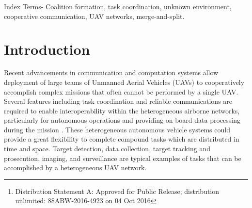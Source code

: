 \documentclass[conference]{IEEEtran}
\theoremstyle{remark}
\theoremstyle{lemma}
\begin{document}
\begin{abstract}
The problem of adversary target detection and the subsequent task completion using a heterogeneous network of resource-constrained UAVs is considered. No prior knowledge about locations and required resources to identify these targets is available to the UAVs. In the proposed leader-follower coalition formation model, the UAV that first locates a target serves as the coalition leader and selects a group of follower UAVs to complete the task associated with the identified target. The goal of the coalition formation is to complete the designated tasks with minimal resource utilization. Another role of coalition members is to make the ground station aware of the detected adversary target by forwarding its signal to the station via a distributed cooperative relaying scheme. We also propose a reputation-based mechanism for coalition formation to monitor the cooperative behavior of the UAVs over the course of time and exclude potentially untrustworthy UAVs. Simulation results show the efficiency of the proposed method in forming optimal coalitions compared to alternative methods.\footnote{ Distribution Statement A: Approved for Public Release; distribution unlimited: 88ABW-2016-4923 on 04 Oct 2016 }




\end{abstract}

Index Terms-  Coalition formation, task coordination, unknown environment, cooperative communication, UAV networks, merge-and-split.

\IEEEpeerreviewmaketitle
\section{Introduction}
Recent advancements in communication and computation systems allow deployment of large teams of Unmanned Aerial Vehicles (UAVs) to cooperatively accomplish complex missions that often cannot be performed by a single UAV. Several features including task coordination and reliable communications are required to enable interoperability within the heterogeneous airborne networks, particularly for autonomous operations and providing on-board data processing during the mission \cite{Razi_WiSEE,Razi_Asilomar}. These heterogeneous autonomous vehicle systems could provide a great flexibility to complete compound tasks which are distributed in time and space. Target detection, data collection, target tracking and prosecution, imaging, and surveillance are typical examples of tasks that can be accomplished by a heterogeneous UAV network.
\end{document}
